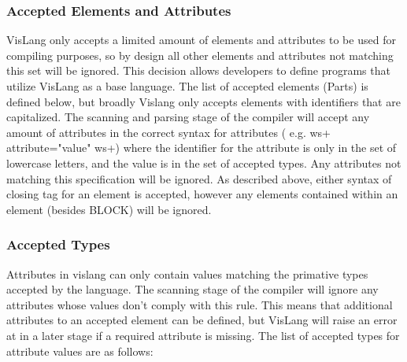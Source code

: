 \subsubsection{Accepted Elements and Attributes}
VisLang only accepts a limited amount of elements and attributes to be used for compiling purposes, so by design all other elements and attributes not matching this set will be ignored.
This decision allows developers to define programs that utilize VisLang as a base language.
The list of accepted elements (Parts) is defined below, but broadly Vislang only accepts elements with identifiers that are capitalized.
The scanning and parsing stage of the compiler will accept any amount of attributes in the correct syntax for attributes ( e.g.
ws+ attribute="value" ws+) where the identifier for the attribute is only in the set of lowercase letters, and the value is in the set of accepted types.
Any attributes not matching this specification will be ignored.
As described above, either syntax of closing tag for an element is accepted, however any elements contained within an element (besides BLOCK) will be ignored.
\subsubsection{Accepted Types}
Attributes in vislang can only contain values matching the primative types accepted by the language.
The scanning stage of the compiler will ignore any attributes whose values don't comply with this rule.
This means that additional attributes to an accepted element can be defined, but VisLang will raise an error at in a later stage if a required attribute is missing.
The list of accepted types for attribute values are as follows:

